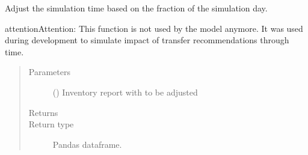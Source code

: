 \documentclass[letterpaper,10pt,english]{sphinxmanual}
\begin{document}
\begin{fulllineitems}
\label{\detokenize{source/optimization.datatools:optimization.datatools.dataprep.adjust_target_simulation}}
Adjust the simulation time based on the fraction of the simulation day.

\begin{sphinxadmonition}{attention}{Attention:}
This function is not used by the model anymore. It was used during development to simulate
impact of transfer recommendations through time.
\end{sphinxadmonition}
\begin{quote}\begin{description}
\item[{Parameters}] \leavevmode
{} () \textendash{} Inventory report with  to be adjusted

\item[{Returns}] \leavevmode
{}

\item[{Return type}] \leavevmode
Pandas dataframe.

\end{description}\end{quote}

\end{fulllineitems}

\end{document}
